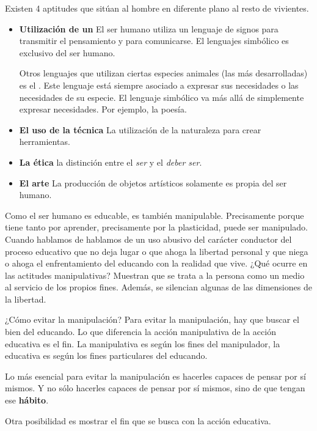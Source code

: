 \documentclass[palatino]{apuntesURJC}
\begin{document}
Existen 4 aptitudes que sitúan al hombre en diferente plano al resto de vivientes.
\begin{itemize}
	\item \textbf{Utilización de un } El ser humano utiliza un lenguaje de signos para transmitir el pensamiento y para comunicarse. El lenguajes simbólico es exclusivo del ser humano.

	Otros lenguajes que utilizan ciertas especies animales (las más desarrolladas) es el .
	Este lenguaje está siempre asociado a expresar sus necesidades o las necesidades de su especie.
	El lenguaje simbólico va más allá de simplemente expresar necesidades. Por ejemplo, la poesía.

	\item \textbf{El uso de la técnica} La utilización de la naturaleza para crear herramientas.
	\item \textbf{La ética} la distinción entre el \textit{ser} y el \textit{deber ser}.
	\item \textbf{El arte} La producción de objetos artísticos solamente es propia del ser humano.
\end{itemize}

Como el ser humano es educable, es también manipulable. Precisamente porque tiene tanto por aprender, precisamente por la plasticidad, puede ser manipulado.
%
Cuando hablamos de  hablamos de un uso abusivo del carácter conductor del proceso educativo que no deja lugar o que ahoga la libertad personal y que niega o ahoga el enfrentamiento del educando con la realidad que vive.
%
¿Qué ocurre en las actitudes manipulativas? Muestran que se trata a la persona como un medio al servicio de los propios fines.
%
Además, se silencian algunas de las dimensiones de la libertad.

¿Cómo evitar la manipulación?
%
Para evitar la manipulación, hay que buscar el bien del educando.
%
Lo que diferencia la acción manipulativa de la acción educativa es el fin.
%
La manipulativa es según los  fines del manipulador, la educativa es según los fines particulares del educando.

Lo más esencial para evitar la manipulación es hacerles capaces de pensar por sí mismos.
%
Y no sólo hacerles capaces de pensar por sí mismos, sino de que tengan ese \textbf{hábito}.

Otra posibilidad es mostrar el fin que se busca con la acción educativa.
\end{document}
